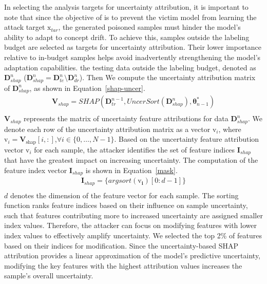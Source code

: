 In selecting the analysis targets for uncertainty attribution, it is important to note that since the objective of \pandora is to prevent the victim model from learning the attack target  $\bm{\mathrm{x}}_{tar}$, the generated poisoned samples must hinder the model’s ability to adapt to concept drift.
To achieve this, samples outside the labeling budget are selected as targets for uncertainty attribution.
Their lower importance relative to in-budget samples helps avoid inadvertently strengthening the model’s adaptation capabilities.
the testing data outside the labeling budget, denoted as $\bm{D}_{shap}^{n}$ ($\bm{D}_{shap}^{n} = \bm{D}_{te}^{n} \setminus \bm{D}_{dr}^{n}$).
Then We compute the uncertainty attribution matrix of $\bm{D}_{shap}^{n}$, as shown in Equation~\ref{shap-uncer}.
\begin{equation}
	\begin{aligned}
		\bm{V}_{shap} = SHAP (\bm{D}_{tr}^{n-1},UncerSort(\bm{D}_{shap}^{n}),\bm{\theta}_{n-1}^{*}) \\
	\end{aligned}
	\label{shap-uncer}
\end{equation}
$\bm{V}_{shap}$ represents the matrix of uncertainty feature attributions for data $\bm{D}_{shap}^{n}$.
We denote each row of the uncertainty attribution matrix as a vector $\bm{\mathrm{v}}_{i}$, where $\bm{\mathrm{v}}_{i} =\bm{V}_{\text{shap}}[i,:]$,$\forall i \in \{0, \dots, N-1 \}$.
Based on the uncertainty feature attribution vector $\bm{\mathrm{v}}_{i}$ for each sample, the attacker identifies the set of feature indices $\bm{I}_{shap}$ that have the greatest impact on increasing uncertainty.
The computation of the feature index vector $\bm{I}_{shap}$ is shown in Equation~\ref{mask}.
\begin{equation}
	\begin{aligned}
		\bm{I}_{shap} = \{ argsort(\bm{\mathrm{v}_{i}})[0:d-1]  \} \\
		\end{aligned}
	\label{mask}
\end{equation}
$d$ denotes the dimension of the feature vector for each sample.
The sorting function ranks feature indices based on their influence on sample uncertainty, such that features contributing more to increased uncertainty are assigned smaller index values.  
Therefore, the attacker can focus on modifying features with lower index values to effectively amplify uncertainty.
We selected the top 2\% of features based on their indices for modification.
Since the uncertainty-based SHAP attribution provides a linear approximation of the model's predictive uncertainty, modifying the key features with the highest attribution values increases the sample's overall uncertainty.

